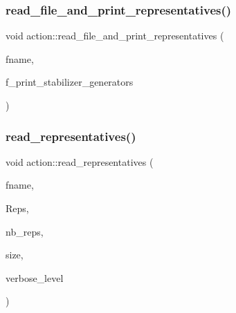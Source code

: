 \subsubsection{\texorpdfstring{read\+\_\+file\+\_\+and\+\_\+print\+\_\+representatives()}{read\_file\_and\_print\_representatives()}}
{\footnotesize\ttfamily void action\+::read\+\_\+file\+\_\+and\+\_\+print\+\_\+representatives (\begin{DoxyParamCaption}\item[{\mbox{\hyperlink{galois_8h_ab6cc7b4aeb6ea31aba2b3fbfc83ff5e6}{B\+Y\+TE}} $\ast$}]{fname,  }\item[{\mbox{\hyperlink{galois_8h_a09fddde158a3a20bd2dcadb609de11dc}{I\+NT}}}]{f\+\_\+print\+\_\+stabilizer\+\_\+generators }\end{DoxyParamCaption})}

\mbox{\label{classaction_a4959d3dd9b20c330b15c31ab6162cc2b}} 
\subsubsection{\texorpdfstring{read\+\_\+representatives()}{read\_representatives()}}
{\footnotesize\ttfamily void action\+::read\+\_\+representatives (\begin{DoxyParamCaption}\item[{\mbox{\hyperlink{galois_8h_ab6cc7b4aeb6ea31aba2b3fbfc83ff5e6}{B\+Y\+TE}} $\ast$}]{fname,  }\item[{\mbox{\hyperlink{galois_8h_a09fddde158a3a20bd2dcadb609de11dc}{I\+NT}} $\ast$\&}]{Reps,  }\item[{\mbox{\hyperlink{galois_8h_a09fddde158a3a20bd2dcadb609de11dc}{I\+NT}} \&}]{nb\+\_\+reps,  }\item[{\mbox{\hyperlink{galois_8h_a09fddde158a3a20bd2dcadb609de11dc}{I\+NT}} \&}]{size,  }\item[{\mbox{\hyperlink{galois_8h_a09fddde158a3a20bd2dcadb609de11dc}{I\+NT}}}]{verbose\+\_\+level }\end{DoxyParamCaption})}

\mbox{\label{classaction_a59ba2fa55080f6b1703141f60e0d3aad}} 
